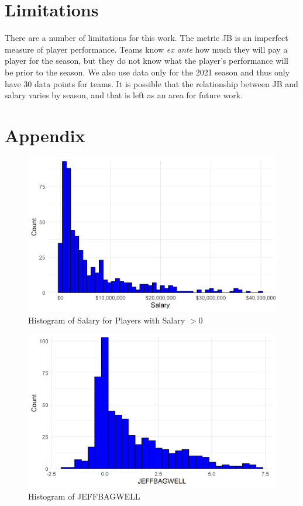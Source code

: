\documentclass{article}
\begin{document}
\section{Limitations}

There are a number of limitations for this work. The metric JB is an imperfect measure of player performance. Teams know \emph{ex ante} how much they will pay a player for the season, but they do not know what the player's performance will be prior to the season. We also use data only for the 2021 season and thus only have 30 data points for teams. It is possible that the relationship between JB and salary varies by season, and that is left as an area for future work. 


%
%

\section{Appendix}

\begin{figure}[t]
\caption{Histogram of Salary for Players with Salary $> 0$}
\label{fig:salary_hist}
\centering
\includegraphics[width=0.7\paperwidth, scale=1.25]{salary_hist.png}
\end{figure}

\begin{figure}[t]
\caption{Histogram of JEFFBAGWELL}
\label{fig:bwar_hist}
\centering
\includegraphics[width=0.7\paperwidth, scale=1.25]{war_hist.png}
\end{figure}

\label{tab:teams_picked}

\end{document}

